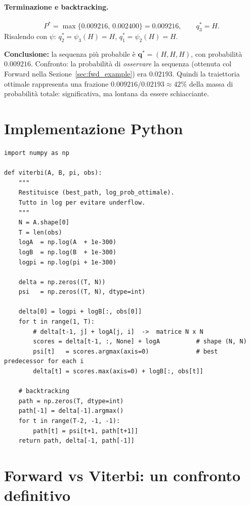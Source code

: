 \documentclass[11pt,a4paper,oneside]{book}
\theoremstyle{plain}
\theoremstyle{definition}
\theoremstyle{remark}
\newcommand{\seqstates}{\mathbf{q}}          %
\begin{document}
\paragraph{Terminazione e backtracking.}
\[
P^* = \max\{0.009216,\,0.002400\} = 0.009216,\qquad q_3^* = H.
\]
Risalendo con $\psi$: $q_2^* = \psi_3(H) = H$, $q_1^* = \psi_2(H) = H$.

\textbf{Conclusione:} la sequenza più probabile è $\seqstates^* = (H,H,H)$,
con probabilità $0.009216$. Confronto: la probabilità di
\emph{osservare} la sequenza (ottenuta col Forward nella
Sezione~\ref{sec:fwd_example}) era $0.02193$. Quindi la traiettoria
ottimale rappresenta una frazione $0.009216/0.02193 \approx 42\%$ della
massa di probabilità totale: significativa, ma lontana da essere
schiacciante.

\section{Implementazione Python}

\begin{lstlisting}[caption={Viterbi in NumPy con log-probabilità per stabilità.}]
import numpy as np

def viterbi(A, B, pi, obs):
    """
    Restituisce (best_path, log_prob_ottimale).
    Tutto in log per evitare underflow.
    """
    N = A.shape[0]
    T = len(obs)
    logA  = np.log(A  + 1e-300)
    logB  = np.log(B  + 1e-300)
    logpi = np.log(pi + 1e-300)

    delta = np.zeros((T, N))
    psi   = np.zeros((T, N), dtype=int)

    delta[0] = logpi + logB[:, obs[0]]
    for t in range(1, T):
        # delta[t-1, j] + logA[j, i]  ->  matrice N x N
        scores = delta[t-1, :, None] + logA          # shape (N, N)
        psi[t]   = scores.argmax(axis=0)             # best predecessor for each i
        delta[t] = scores.max(axis=0) + logB[:, obs[t]]

    # backtracking
    path = np.zeros(T, dtype=int)
    path[-1] = delta[-1].argmax()
    for t in range(T-2, -1, -1):
        path[t] = psi[t+1, path[t+1]]
    return path, delta[-1, path[-1]]
\end{lstlisting}

\section{Forward vs Viterbi: un confronto definitivo}
\end{document}
